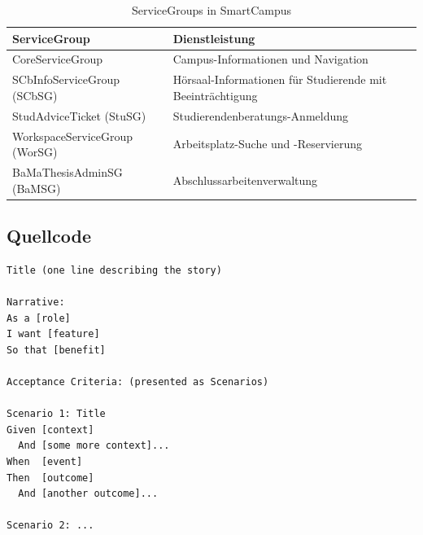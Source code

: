\begin{table}
	\centering
	\begin{tabular}{ | l | p{7cm} | }
		\hline
		ServiceGroup & Dienstleistung \\
		\hline
		 CoreServiceGroup & Campus-Informationen und Navigation \\
	 	\hline
	 	SCbInfoServiceGroup (SCbSG) & Hörsaal-Informationen für Studierende mit Beeinträchtigung \\
	 	\hline
	 	 StudAdviceTicket (StuSG) & Studierendenberatungs-Anmeldung \\
	 	\hline
	 	WorkspaceServiceGroup (WorSG) & Arbeitsplatz-Suche und -Reservierung \\
	 	\hline
	 	BaMaThesisAdminSG (BaMSG) & Abschlussarbeitenverwaltung \\
	 	\hline
	\end{tabular}
	\caption{ServiceGroups in SmartCampus}
	\label{tab:smartcampus-servicegroups}
\end{table}

\subsection{Quellcode}
\vspace{0.5cm}
\begin{lstlisting}[caption = {Vorlage für eine Story und Szenarien nach BDD}, label = {lst:bdd-stories-szenarien-template}, style = kit-cm, language = Gherkin]
Title (one line describing the story)
 
Narrative:
As a [role]
I want [feature]
So that [benefit]
 
Acceptance Criteria: (presented as Scenarios)
 
Scenario 1: Title
Given [context]
  And [some more context]...
When  [event]
Then  [outcome]
  And [another outcome]...
 
Scenario 2: ...
\end{lstlisting}
\fi

